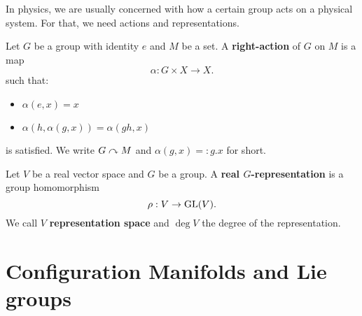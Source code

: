 In physics, we are usually concerned with how a certain group acts on a physical system. For that, we need actions and representations.
\begin{definition}
    Let $G$ be a group with identity $e$ and $M$ be a set. A \textbf{right-action} of $G$ on $M$ is a map \[
    \alpha: G \times X \to X
    .\] 
    such that:
    \begin{itemize}
        \item $\alpha(e,x) = x$
        \item $\alpha(h, \alpha(g,x))=\alpha(gh,x)$
    \end{itemize}
    is satisfied. We write $G \curvearrowright M$ and $\alpha(g,x)=:g.x$ for short.
\end{definition}
\begin{definition}[Representation]
    Let $V$ be a real vector space and $G$ be a group. A \textbf{real $G$-representation} is a group homomorphism \[
    \rho: V \to \operatorname{GL}(V)
    .\] 
    We call $V$ \textbf{representation space} and $\deg V$ the degree of the representation.
    
\end{definition}
\section{Configuration Manifolds and Lie groups}

